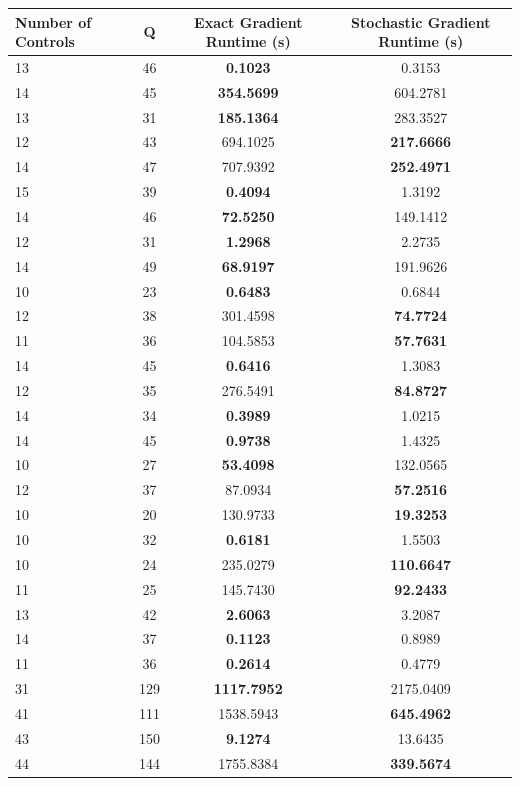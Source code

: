 \documentclass{article}
\begin{document}
\begin{table}[h]
\centering
\begin{tabular}{lccc}
\toprule
Number of Controls & Q & Exact Gradient Runtime (s) & Stochastic Gradient Runtime (s) \\
\midrule
13 & 46 & \textbf{0.1023} & 0.3153 \\
14 & 45 & \textbf{354.5699} & 604.2781 \\
13 & 31 & \textbf{185.1364} & 283.3527 \\
12 & 43 & 694.1025 & \textbf{217.6666} \\
14 & 47 & 707.9392 & \textbf{252.4971} \\
15 & 39 & \textbf{0.4094} & 1.3192 \\
14 & 46 & \textbf{72.5250} & 149.1412 \\
12 & 31 & \textbf{1.2968} & 2.2735 \\
14 & 49 & \textbf{68.9197} & 191.9626 \\
10 & 23 & \textbf{0.6483} & 0.6844 \\
12 & 38 & 301.4598 & \textbf{74.7724} \\
11 & 36 & 104.5853 & \textbf{57.7631} \\
14 & 45 & \textbf{0.6416} & 1.3083 \\
12 & 35 & 276.5491 & \textbf{84.8727} \\
14 & 34 & \textbf{0.3989} & 1.0215 \\
14 & 45 & \textbf{0.9738} & 1.4325 \\
10 & 27 & \textbf{53.4098} & 132.0565 \\
12 & 37 & 87.0934 & \textbf{57.2516} \\
10 & 20 & 130.9733 & \textbf{19.3253} \\
10 & 32 & \textbf{0.6181} & 1.5503 \\
10 & 24 & 235.0279 & \textbf{110.6647} \\
11 & 25 & 145.7430 & \textbf{92.2433} \\
13 & 42 & \textbf{2.6063} & 3.2087 \\
14 & 37 & \textbf{0.1123} & 0.8989 \\
11 & 36 & \textbf{0.2614} & 0.4779 \\
31 & 129 & \textbf{1117.7952} & 2175.0409 \\
41 & 111 & 1538.5943 & \textbf{645.4962} \\
43 & 150 & \textbf{9.1274} & 13.6435 \\
44 & 144 & 1755.8384 & \textbf{339.5674} \\

\end{tabular}
\end{table}
\end{document}
